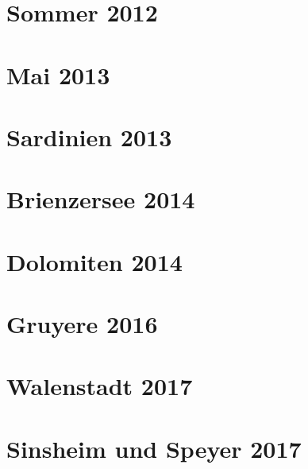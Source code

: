 \documentclass[11pt,nswissgerman]{article}
\begin{document}
\section{Sommer 2012}

\newpage
\section{Mai 2013}

\newpage
\section{Sardinien 2013}

\newpage
\section{Brienzersee 2014}

\newpage
\section{Dolomiten 2014}

\newpage
\section{Gruyere 2016}

\newpage
\section{Walenstadt 2017}

\newpage
\section{Sinsheim und Speyer 2017}

\newpage
\listoffigures
\newpage
\appendix
\end{document}
